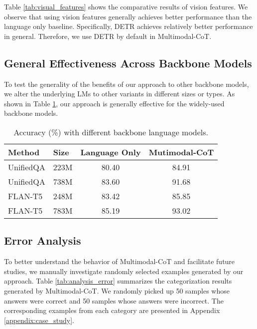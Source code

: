 \documentclass[nohyperref]{article}
\theoremstyle{plain}
\theoremstyle{definition}
\theoremstyle{remark}
\begin{document}
Table \ref{tab:visual_features} shows the comparative results of vision features. We observe that using vision features generally achieves better performance than the language only baseline. Specifically, DETR achieves {relatively better} performance in general. Therefore, we use DETR by default in Multimodal-CoT.

\subsection{General Effectiveness Across Backbone Models}\label{sec:backbones}
To test the generality of the benefits of our approach to other backbone models, we alter the underlying LMs to other variants in different sizes or types. As shown in Table \ref{tab:backbone}, our approach is generally effective for the widely-used backbone models.


\begin{table}[htb]
\vspace{-2mm}
    \centering\small
        \caption{Accuracy (\%) with different backbone language models. \label{tab:backbone}}
   \setlength{\tabcolsep}{2.5pt}
\begin{tabular}{llcc}\toprule
 {Method} & {Size} & {Language Only} & {Mutimodal-CoT} \\\midrule
 UnifiedQA & 223M & 80.40 & 84.91  \\
 UnifiedQA & 738M & 83.60 & 91.68\\
 \midrule
 FLAN-T5 & 248M &83.42  & 85.85  \\
 FLAN-T5 & 783M & 85.19& 93.02 \\
\bottomrule
\end{tabular}
\vspace{-3.6mm}
\end{table}



\subsection{Error Analysis}\label{sec:case_studies}

To better understand the behavior of Multimodal-CoT and facilitate future studies, we manually investigate randomly selected examples generated by our approach. Table \ref{tab:analysis_error} summarizes the categorization results generated by Multimodal-CoT. We randomly picked up 50 samples whose answers were correct and 50 samples whose answers were incorrect. The corresponding examples from each category are presented in Appendix \ref{appendix:case_study}.
\end{document}
